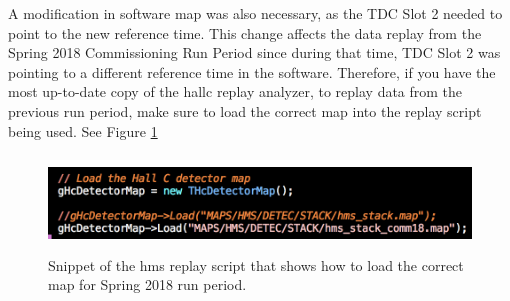 \documentclass[11pt]{article}
\begin{document}
A modification in software map was also necessary, as the TDC Slot 2 needed to point to the new reference time. This change affects the data replay from the
Spring 2018 Commissioning Run Period since during that time, TDC Slot 2 was pointing to a different reference time in the software. Therefore, if you have the most up-to-date copy of the
hallc replay analyzer, to replay data from the previous run period, make sure to load the correct map into the replay script being used. See Figure \ref{fig:map} 

\begin{figure}[h]
  \centering
  \includegraphics[width=5.0in, height=1.0in]{loadmap.png}
  \caption{Snippet of the hms replay script that shows how to load the correct map for Spring 2018 run period.}
  \label{fig:map}
\end{figure}
\end{document}
